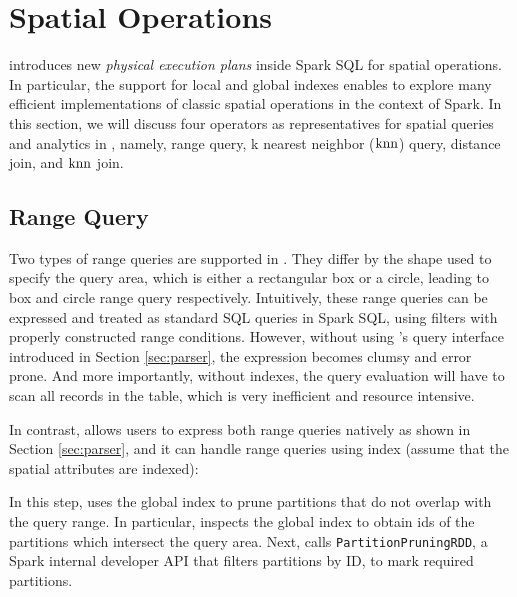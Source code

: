 \section{Spatial Operations}
\label{sec:query}
\name introduces new {\em physical execution plans} inside Spark SQL
for spatial operations. In particular, the support for local and
global indexes enables \name to explore many efficient implementations
of classic spatial operations in the context of Spark. In this
section, we will discuss four operators as representatives for spatial
queries and analytics in \name, namely, range query, k nearest
neighbor ($\operatorname{knn}$) query, distance join, and $\operatorname{knn}$ join.

\subsection{Range Query}
\label{sub:range}
Two types of range queries are supported in \name. They differ by the
shape used to specify the query area, which is either a rectangular
box or a circle, leading to box and circle range query
respectively. Intuitively, these range queries can be expressed and
treated as standard SQL queries in Spark SQL, using filters with
properly constructed range conditions. However, without using \name's
query interface introduced in Section \ref{sec:parser}, the expression
becomes clumsy and error prone. And more importantly, without indexes,
the query evaluation will have to scan all records in the table, which
is very inefficient and resource intensive.

In contrast, \name allows users to express both range queries
natively as shown in Section \ref{sec:parser}, and it can handle range
queries using index (assume that the spatial attributes are indexed):



 In this step, \name uses the global
index to prune partitions that do not overlap with the query range. In
particular, \name inspects the global index to obtain ids of the
partitions which intersect the query area. Next, \name calls
\texttt{PartitionPruningRDD}, a Spark internal developer API that
filters partitions by ID, to mark required partitions.

